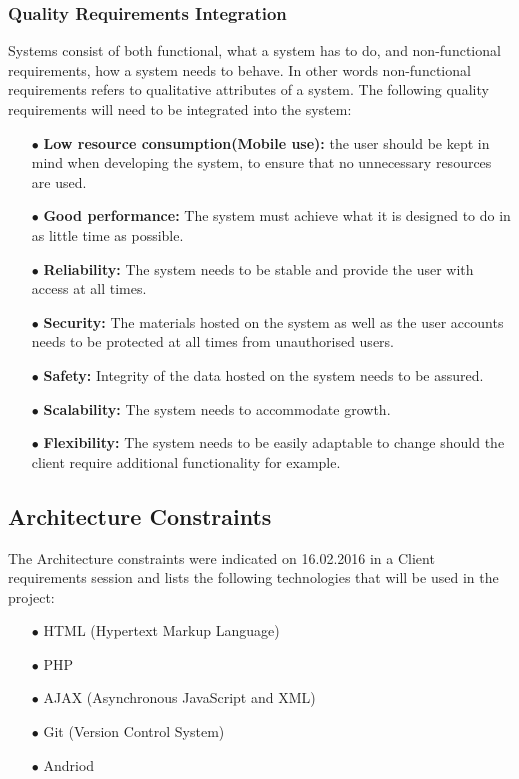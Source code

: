 \documentclass[a4paper,12pt]{article}
\begin{document}
\subsubsection{Quality Requirements Integration}
Systems consist of both functional, what a system has to do, and non-functional requirements, how a system needs to behave. In other words non-functional requirements refers to qualitative attributes of a system. The following quality requirements will need to be integrated into the system:
\begin{itemize}
	\item[$\bullet$]\textbf{Low resource consumption(Mobile use): } the user should be kept in mind when developing the system, to ensure that no unnecessary resources are used.
	\item[$\bullet$]\textbf{Good performance: }The system must achieve what it is designed to do in as little time as possible.
	\item[$\bullet$]\textbf{Reliability: }The system needs to be stable and provide the user with access at all times.
	\item[$\bullet$]\textbf{Security: }The materials hosted on the system as well as the user accounts needs to be protected at all times from unauthorised users.
	\item[$\bullet$]\textbf{Safety: }Integrity of the data hosted on the system needs to be assured.
	\item[$\bullet$]\textbf{Scalability: }The system needs to accommodate growth.
	\item[$\bullet$]\textbf{Flexibility: }The system needs to be easily adaptable to change should the client require additional functionality for example.
\end{itemize}

\subsection{Architecture Constraints}
The Architecture constraints were indicated on 16.02.2016 in a Client requirements session and lists the following technologies that will be used in the project:
\begin{itemize}
	\item[$\bullet$]HTML (Hypertext Markup Language) 
	\item[$\bullet$]PHP
	\item[$\bullet$]AJAX (Asynchronous JavaScript and XML)
	\item[$\bullet$]Git (Version Control System)
	\item[$\bullet$]Andriod
	\\
\end{itemize}
\end{document}
